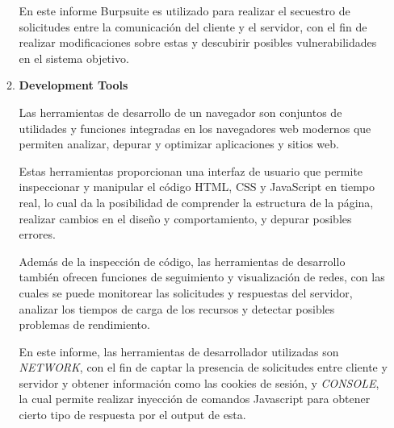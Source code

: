 \documentclass[12pt,oneside,a4paper]{book}
\begin{document}
\begin{enumerate}
\begin{enumerate}
        \hspace{20pt}
        En este informe Burpsuite es utilizado para realizar el secuestro de solicitudes entre la comunicación del cliente y el servidor, con el fin de realizar modificaciones sobre estas y descubirir posibles vulnerabilidades en el sistema objetivo.

        \newpage

        \item{\textbf{Development Tools}}

        \vspace{1em}

        \hspace{20pt}
        Las herramientas de desarrollo de un navegador son conjuntos de utilidades y funciones integradas en los navegadores web modernos que permiten analizar, depurar y optimizar aplicaciones y sitios web.

        \vspace{1em}

        \hspace{20pt}
        Estas herramientas proporcionan una interfaz de usuario que permite inspeccionar y manipular el código HTML, CSS y JavaScript en tiempo real, lo cual da la posibilidad de comprender la estructura de la página, realizar cambios en el diseño y comportamiento, y depurar posibles errores.

        \vspace{1em}

        \hspace{20pt}
        Además de la inspección de código, las herramientas de desarrollo también ofrecen funciones de seguimiento y visualización de redes, con las cuales se puede monitorear las solicitudes y respuestas del servidor, analizar los tiempos de carga de los recursos y detectar posibles problemas de rendimiento.

        \vspace{1em}

        \hspace{20pt}
        En este informe, las herramientas de desarrollador utilizadas son \textit{NETWORK}, con el fin de captar la presencia de solicitudes entre cliente y servidor y obtener información como las cookies de sesión, y \textit{CONSOLE}, la cual permite realizar inyección de comandos Javascript para obtener cierto tipo de respuesta por el output de esta.
        
        \vspace{2em}

    \end{enumerate}
\end{enumerate}
        

\vspace{2em}
\end{document}
